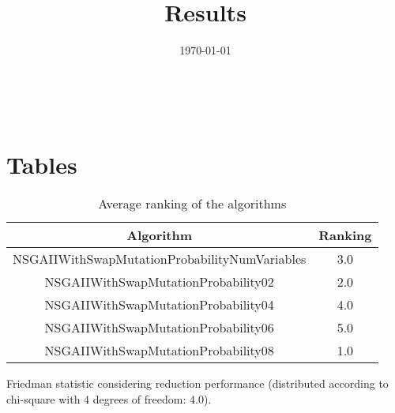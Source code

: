\documentclass{article}
\title{Results}
\author{}
\date{\today}
\begin{document}
\oddsidemargin 0in \topmargin 0in\maketitle
\
\section{Tables}
\begin{table}[!htp]
\centering
\caption{Average ranking of the algorithms}
\begin{tabular}{c|c}
Algorithm&Ranking\\
\hline
NSGAIIWithSwapMutationProbabilityNumVariables&3.0\\
NSGAIIWithSwapMutationProbability02&2.0\\
NSGAIIWithSwapMutationProbability04&4.0\\
NSGAIIWithSwapMutationProbability06&5.0\\
NSGAIIWithSwapMutationProbability08&1.0\\
\end{tabular}
\end{table}


Friedman statistic considering reduction performance (distributed according to chi-square with 4 degrees of freedom: 4.0).
\end{document}
